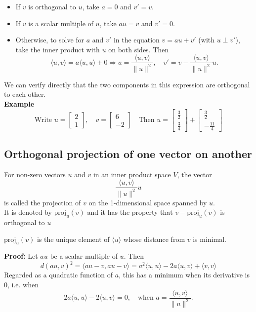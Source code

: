 \documentclass[a4paper, 9pt]{extarticle}
\begin{document}
\begin{itemize}
  \item If $v$ is orthogonal to $u$, take $a = 0$ and $v' = v$.

  \item If $v$ is a scalar multiple of $u$, take $au = v$ and $v' = 0$.

  \item Otherwise, to solve for $a$ and $v'$ in the equation $v = au + v'$ (with $u \perp v'$), take the inner product with $u$ on both sides. Then
        $$
          \langle u, v \rangle = a \langle u, u \rangle + 0 \Longrightarrow a = \frac{\langle u, v \rangle}{\|u\|^2}, \quad
          v' = v - \frac{\langle u, v \rangle}{\|u\|^2} u.
        $$
\end{itemize}
We can verify directly that the two components in this expression are orthogonal to each other. \\[2ex]
\noindent \textbf{Example}
$$\text{Write } u = \begin{bmatrix} 2 \\ 1 \end{bmatrix},\quad v = \begin{bmatrix} 6 \\ -2 \end{bmatrix} \quad \text{Then } u = \begin{bmatrix} \frac{3}{2} \\ \frac{3}{4} \end{bmatrix} + \begin{bmatrix} \frac{3}{2} \\ -\frac{11}{4} \end{bmatrix}$$

\subsection{Orthogonal projection of one vector on another}
\begin{definitionbox}{}{}
  For non-zero vectors $u$ and $v$ in an inner product space $V$, the vector
  $$
    \frac{\langle u, v \rangle}{\|u\|^2} u
  $$
  is called the projection of $v$ on the 1-dimensional space spanned by $u$. \\
  It is denoted by $\text{proj}_u(v)$ and it has the property that $v - \text{proj}_u(v)$ is orthogonal to $u$
\end{definitionbox}
\begin{lemmabox}{}{}
  $\text{proj}_u(v)$ is the unique element of $\langle u \rangle$ whose distance from $v$ is minimal.
\end{lemmabox}
\noindent \textbf{Proof:} Let $au$ be a scalar multiple of $u$. Then
$$
  d(au, v)^2 = \langle au - v, au - v \rangle = a^2 \langle u, u \rangle - 2a \langle u, v \rangle + \langle v, v \rangle
$$
Regarded as a quadratic function of $a$, this has a minimum when its derivative is 0, i.e. when
$$
  2a \langle u, u \rangle - 2 \langle u, v \rangle = 0, \quad \text{when } a = \frac{\langle u, v \rangle}{\|u\|^2}.
$$
\end{document}
